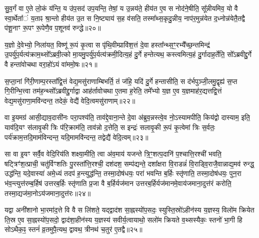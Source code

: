 {\anuvakamend[{अ॒सि॒ष्य॒तीति॑ जुहु॒याथ्सा॒यम्प्रा॑तरुप॒सद॒श्चतु॑र्विꣳशतिः॒ सञ्च॒तुरो\-ऽग्रे॒ षोड॑श च}]}%

सु॒व॒र्गं वा ए॒ते लो॒कं य॑न्ति॒ य उ॑प॒सद॑ उप॒यन्ति॒ तेषां॒ य उ॒न्नय॑ते॒ हीय॑त ए॒व स नोद॑ने॒षीति॒ सू᳚न्नीयमिव॒ यो वै स्वा॒र्थेता᳚ं य॒ताꣴ श्रा॒न्तो हीय॑त उ॒त स नि॒ष्ट्याय॑ स॒ह व॑सति॒ तस्मा᳚थ्स॒कृदु॒न्नीय॒ नाप॑र॒मुन्न॑येत द॒ध्नोन्न॑येतै॒तद्वै प॑शू॒नाꣳ रू॒पꣳ रू॒पेणै॒व प॒शूनव॑ रुन्द्धे॥२०॥

य॒ज्ञो दे॒वेभ्यो॒ निला॑यत॒ विष्णू॑ रू॒पं कृ॒त्वा स पृ॑थि॒वीम्प्रावि॑श॒त्तं दे॒वा हस्ता᳚न्थ्स॒ꣳ॒रभ्यै᳚च्छ॒न्तमिन्द्र॑ उ॒पर्यु॑प॒र्यत्य॑क्राम॒थ्सो᳚\-ऽब्रवी॒त्को मा॒यमु॒पर्यु॑प॒र्यत्य॑क्रमी॒दित्य॒हं दु॒र्गे हन्तेत्यथ॒ कस्त्वमित्य॒हं दु॒र्गादाह॒र्तेति॒ सो᳚\-ऽब्रवीद्दु॒र्गे वै हन्ता॑वोचथा वरा॒हो॑\-ऽयं वा॑ममो॒षः॥२१॥

स॒प्ता॒नां गि॑री॒णाम्प॒रस्ता᳚द्वि॒त्तं वेद्य॒मसु॑राणाम्बिभर्ति॒ तं ज॑हि॒ यदि॑ दु॒र्गे हन्तासीति॒ स द॑र्भपुञ्जी॒लमु॒द्वृह्य॑ स॒प्त गि॒रीन्भि॒त्त्वा तम॑ह॒न्थ्सो᳚\-ऽब्रवीद्दु॒र्गाद्वा आह॑र्तावोचथा ए॒तमा ह॒रेति॒ तमे᳚भ्यो य॒ज्ञ ए॒व य॒ज्ञमाह॑र॒द्यत्तद्वि॒त्तं वेद्य॒मसु॑राणा॒मवि॑न्दन्त॒ तदेकं॒ वेद्यै॑ वेदि॒त्वमसु॑राणाम्॥२२॥

वा इ॒यमग्र॑ आसी॒द्याव॒दासी॑नः परा॒पश्य॑ति॒ ताव॑द्दे॒वाना॒न्ते दे॒वा अ॑ब्रुव॒न्नस्त्वे॒व नो॒\-ऽस्यामपीति॒ किय॑द्वो दास्याम॒ इति॒ याव॑दि॒यꣳ स॑लावृ॒की त्रिः प॑रि॒क्राम॑ति॒ ताव॑न्नो द॒त्तेति॒ स इन्द्रः॑ सलावृ॒की रू॒पं कृ॒त्वेमां त्रिः स॒र्वतः॒ पर्य॑क्राम॒त्तदि॒माम॑विन्दन्त॒ यदि॒मामवि॑न्दन्त॒ तद्वेद्यै॑ वेदि॒त्वम्॥२३॥

सा वा इ॒यꣳ सर्वै॒व वेदि॒रिय॑ति शक्ष्या॒मीति॒ त्वा अ॑व॒माय॑ यजन्ते त्रि॒ꣳ॒शत्प॒दानि॑ प॒श्चात्ति॒रश्ची॑ भवति॒ षट्त्रिꣳ॑श॒त्प्राची॒ चतु॑र्विꣳशतिः पु॒रस्ता᳚त्ति॒रश्ची॒ दश॑दश॒ सम्प॑द्यन्ते॒ दशा᳚क्षरा वि॒राडन्नं॑ वि॒राड्वि॒राजै॒वान्नाद्य॒मव॑ रुन्द्ध॒ उद्ध॑न्ति॒ यदे॒वास्या॑ अमे॒ध्यं तदप॑ ह॒न्त्युद्ध॑न्ति॒ तस्मा॒दोष॑धयः॒ परा॑ भवन्ति ब॒र्\mbox{}हिः स्तृ॑णाति॒ तस्मा॒दोष॑धयः॒ पुन॒रा भ॑व॒न्त्युत्त॑रम्ब॒र्\mbox{}हिष॑ उत्तरब॒र्\mbox{}हिः स्तृ॑णाति प्र॒जा वै ब॒र्\mbox{}हिर्यज॑मान उत्तरब॒र्\mbox{}हिर्यज॑मानमे॒वाय॑जमाना॒दुत्त॑रं करोति॒ तस्मा॒द्यज॑मा॒नो\-ऽय॑जमाना॒दुत्त॑रः॥२४॥

{}%

यद्वा अनी॑शानो भा॒रमा॑द॒त्ते वि वै स लि॑शते॒ यद्द्वाद॑श सा॒ह्नस्यो॑प॒सदः॒ स्युस्ति॒स्रो॑\-ऽहीन॑स्य य॒ज्ञस्य॒ विलो॑म क्रियेत ति॒स्र ए॒व सा॒ह्नस्यो॑प॒सदो॒ द्वाद॑शा॒हीन॑स्य य॒ज्ञस्य॑ सवीर्य॒त्वायाथो॒ सलो॑म क्रियते व॒थ्सस्यैकः॒ स्तनो॑ भा॒गी हि सो\-ऽथैक॒ꣴ॒ स्तनं॑ व्र॒तमुपै॒त्यथ॒ द्वावथ॒ त्रीनथ॑ च॒तुर॑ ए॒तद्वै॥२५॥

